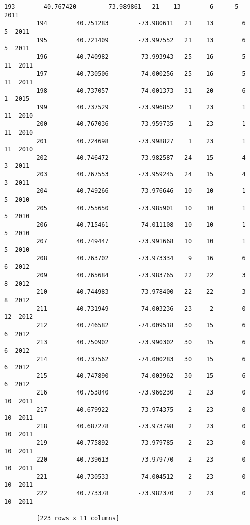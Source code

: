 \documentclass[11pt]{article}
\begin{document}
\begin{Verbatim}[commandchars=\\\{\}]
         193        40.767420        -73.989861   21    13        6      5  2011  
         194        40.751283        -73.980611   21    13        6      5  2011  
         195        40.721409        -73.997552   21    13        6      5  2011  
         196        40.740982        -73.993943   25    16        5     11  2011  
         197        40.730506        -74.000256   25    16        5     11  2011  
         198        40.737057        -74.001373   31    20        6      1  2015  
         199        40.737529        -73.996852    1    23        1     11  2010  
         200        40.767036        -73.959735    1    23        1     11  2010  
         201        40.724698        -73.998827    1    23        1     11  2010  
         202        40.746472        -73.982587   24    15        4      3  2011  
         203        40.767553        -73.959245   24    15        4      3  2011  
         204        40.749266        -73.976646   10    10        1      5  2010  
         205        40.755650        -73.985901   10    10        1      5  2010  
         206        40.715461        -74.011108   10    10        1      5  2010  
         207        40.749447        -73.991668   10    10        1      5  2010  
         208        40.763702        -73.973334    9    16        6      6  2012  
         209        40.765684        -73.983765   22    22        3      8  2012  
         210        40.744983        -73.978400   22    22        3      8  2012  
         211        40.731949        -74.003236   23     2        0     12  2012  
         212        40.746582        -74.009518   30    15        6      6  2012  
         213        40.750902        -73.990302   30    15        6      6  2012  
         214        40.737562        -74.000283   30    15        6      6  2012  
         215        40.747890        -74.003962   30    15        6      6  2012  
         216        40.753840        -73.966230    2    23        0     10  2011  
         217        40.679922        -73.974375    2    23        0     10  2011  
         218        40.687278        -73.973798    2    23        0     10  2011  
         219        40.775892        -73.979785    2    23        0     10  2011  
         220        40.739613        -73.979770    2    23        0     10  2011  
         221        40.730533        -74.004512    2    23        0     10  2011  
         222        40.773378        -73.982370    2    23        0     10  2011  
         
         [223 rows x 11 columns]
\end{Verbatim}
            
\end{document}
